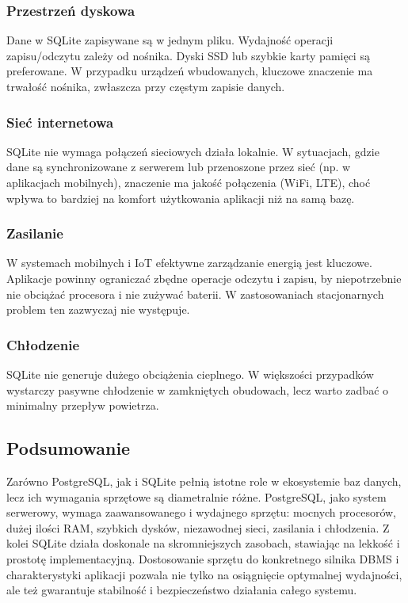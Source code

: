 \documentclass[a4paper,11pt,openany,english]{sphinxmanual}
\begin{document}
\subsubsection{Przestrzeń dyskowa}
\label{\detokenize{rozdzial2/Sprzet-dla-bazy-danych/source/SprzetDlaBazyDanych:id3}}
\sphinxAtStartPar
Dane w SQLite zapisywane są w jednym pliku. Wydajność operacji zapisu/odczytu zależy od nośnika. Dyski SSD lub szybkie karty pamięci są preferowane. W przypadku urządzeń wbudowanych, kluczowe znaczenie ma trwałość nośnika, zwłaszcza przy częstym zapisie danych.


\subsubsection{Sieć internetowa}
\label{\detokenize{rozdzial2/Sprzet-dla-bazy-danych/source/SprzetDlaBazyDanych:id4}}
\sphinxAtStartPar
SQLite nie wymaga połączeń sieciowych \textendash{} działa lokalnie. W sytuacjach, gdzie dane są synchronizowane z serwerem lub przenoszone przez sieć (np. w aplikacjach mobilnych), znaczenie ma jakość połączenia (Wi\sphinxhyphen{}Fi, LTE), choć wpływa to bardziej na komfort użytkowania aplikacji niż na samą bazę.


\subsubsection{Zasilanie}
\label{\detokenize{rozdzial2/Sprzet-dla-bazy-danych/source/SprzetDlaBazyDanych:id5}}
\sphinxAtStartPar
W systemach mobilnych i IoT efektywne zarządzanie energią jest kluczowe. Aplikacje powinny ograniczać zbędne operacje odczytu i zapisu, by niepotrzebnie nie obciążać procesora i nie zużywać baterii. W zastosowaniach stacjonarnych problem ten zazwyczaj nie występuje.


\subsubsection{Chłodzenie}
\label{\detokenize{rozdzial2/Sprzet-dla-bazy-danych/source/SprzetDlaBazyDanych:id6}}
\sphinxAtStartPar
SQLite nie generuje dużego obciążenia cieplnego. W większości przypadków wystarczy pasywne chłodzenie w zamkniętych obudowach, lecz warto zadbać o minimalny przepływ powietrza.


\subsection{Podsumowanie}
\label{\detokenize{rozdzial2/Sprzet-dla-bazy-danych/source/SprzetDlaBazyDanych:podsumowanie}}
\sphinxAtStartPar
Zarówno PostgreSQL, jak i SQLite pełnią istotne role w ekosystemie baz danych, lecz ich wymagania sprzętowe są diametralnie różne. PostgreSQL, jako system serwerowy, wymaga zaawansowanego i wydajnego sprzętu: mocnych procesorów, dużej ilości RAM, szybkich dysków, niezawodnej sieci, zasilania i chłodzenia.
Z kolei SQLite działa doskonale na skromniejszych zasobach, stawiając na lekkość i prostotę implementacyjną.
Dostosowanie sprzętu do konkretnego silnika DBMS i charakterystyki aplikacji pozwala nie tylko na osiągnięcie optymalnej wydajności, ale też gwarantuje stabilność i bezpieczeństwo działania całego systemu.
\end{document}
